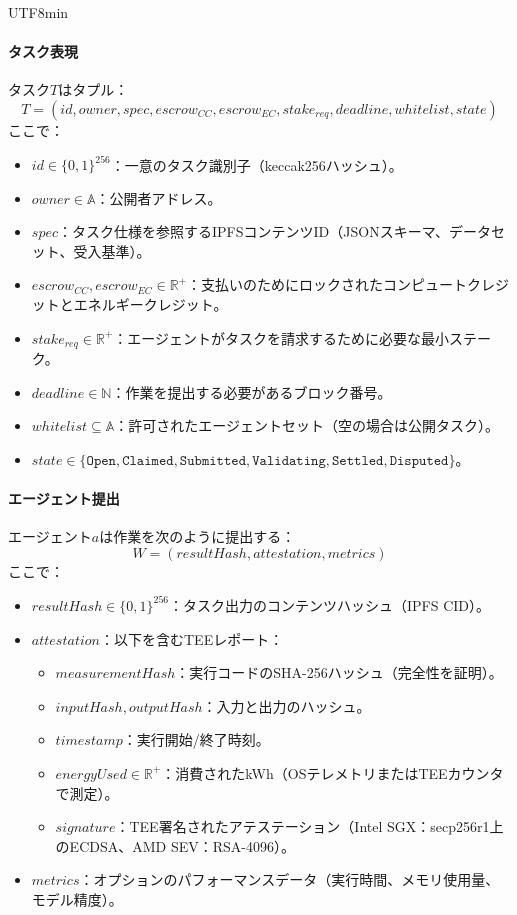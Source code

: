 \documentclass[11pt]{article}
\begin{document}
\begin{CJK}{UTF8}{min}
\paragraph{タスク表現} タスク$T$はタプル：
\begin{equation}
T = (id, owner, spec, escrow_{CC}, escrow_{EC}, stake_{req}, deadline, whitelist, state)
\end{equation}
ここで：
\begin{itemize}[noitemsep]
  \item $id \in \{0,1\}^{256}$：一意のタスク識別子（keccak256ハッシュ）。
  \item $owner \in \mathbb{A}$：公開者アドレス。
  \item $spec$：タスク仕様を参照するIPFSコンテンツID（JSONスキーマ、データセット、受入基準）。
  \item $escrow_{CC}, escrow_{EC} \in \mathbb{R}^+$：支払いのためにロックされたコンピュートクレジットとエネルギークレジット。
  \item $stake_{req} \in \mathbb{R}^+$：エージェントがタスクを請求するために必要な最小ステーク。
  \item $deadline \in \mathbb{N}$：作業を提出する必要があるブロック番号。
  \item $whitelist \subseteq \mathbb{A}$：許可されたエージェントセット（空の場合は公開タスク）。
  \item $state \in \{\texttt{Open}, \texttt{Claimed}, \texttt{Submitted}, \texttt{Validating}, \texttt{Settled}, \texttt{Disputed}\}$。
\end{itemize}

\paragraph{エージェント提出} エージェント$a$は作業を次のように提出する：
\begin{equation}
W = (resultHash, attestation, metrics)
\end{equation}
ここで：
\begin{itemize}[noitemsep]
  \item $resultHash \in \{0,1\}^{256}$：タスク出力のコンテンツハッシュ（IPFS CID）。
  \item $attestation$：以下を含むTEEレポート：
    \begin{itemize}[noitemsep]
      \item $measurementHash$：実行コードのSHA-256ハッシュ（完全性を証明）。
      \item $inputHash, outputHash$：入力と出力のハッシュ。
      \item $timestamp$：実行開始/終了時刻。
      \item $energyUsed \in \mathbb{R}^+$：消費されたkWh（OSテレメトリまたはTEEカウンタで測定）。
      \item $signature$：TEE署名されたアテステーション（Intel SGX：secp256r1上のECDSA、AMD SEV：RSA-4096）。
    \end{itemize}
  \item $metrics$：オプションのパフォーマンスデータ（実行時間、メモリ使用量、モデル精度）。
\end{itemize}


\end{CJK}
\end{document}
